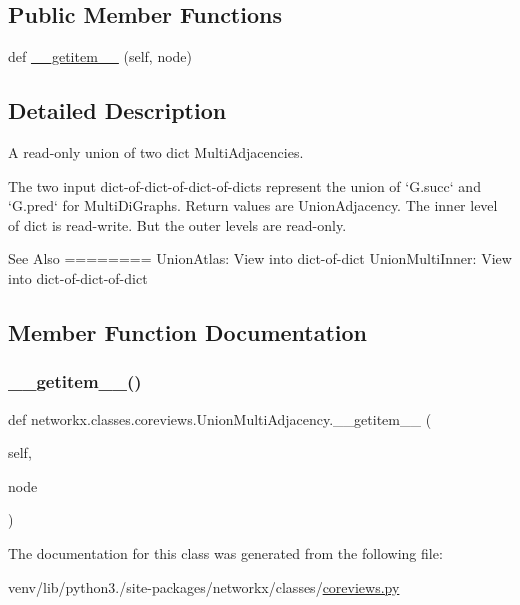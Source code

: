\subsection*{Public Member Functions}
\begin{DoxyCompactItemize}
\item 
def \hyperlink{classnetworkx_1_1classes_1_1coreviews_1_1UnionMultiAdjacency_ac5605f6ea23cf91359501ce65d60f26f}{\+\_\+\+\_\+getitem\+\_\+\+\_\+} (self, node)
\end{DoxyCompactItemize}


\subsection{Detailed Description}
\begin{DoxyVerb}A read-only union of two dict MultiAdjacencies.

The two input dict-of-dict-of-dict-of-dicts represent the union of
`G.succ` and `G.pred` for MultiDiGraphs. Return values are UnionAdjacency.
The inner level of dict is read-write. But the outer levels are read-only.

See Also
========
UnionAtlas:  View into dict-of-dict
UnionMultiInner:  View into dict-of-dict-of-dict
\end{DoxyVerb}
 

\subsection{Member Function Documentation}
\mbox{\label{classnetworkx_1_1classes_1_1coreviews_1_1UnionMultiAdjacency_ac5605f6ea23cf91359501ce65d60f26f}} 
\subsubsection{\texorpdfstring{\+\_\+\+\_\+getitem\+\_\+\+\_\+()}{\_\_getitem\_\_()}}
{\footnotesize\ttfamily def networkx.\+classes.\+coreviews.\+Union\+Multi\+Adjacency.\+\_\+\+\_\+getitem\+\_\+\+\_\+ (\begin{DoxyParamCaption}\item[{}]{self,  }\item[{}]{node }\end{DoxyParamCaption})}



The documentation for this class was generated from the following file\+:\begin{DoxyCompactItemize}
\item 
venv/lib/python3./site-\/packages/networkx/classes/\hyperlink{coreviews_8py}{coreviews.\+py}\end{DoxyCompactItemize}
